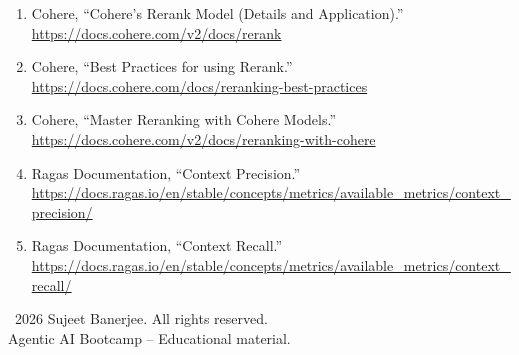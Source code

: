 \documentclass[12pt, a4paper]{article}
\begin{document}
\begin{enumerate}
    \item Cohere, ``Cohere's Rerank Model (Details and Application).''\\
    \url{https://docs.cohere.com/v2/docs/rerank}

    \item Cohere, ``Best Practices for using Rerank.''\\
    \url{https://docs.cohere.com/docs/reranking-best-practices}

    \item Cohere, ``Master Reranking with Cohere Models.''\\
    \url{https://docs.cohere.com/v2/docs/reranking-with-cohere}

    \item Ragas Documentation, ``Context Precision.''\\
    \url{https://docs.ragas.io/en/stable/concepts/metrics/available_metrics/context_precision/}

    \item Ragas Documentation, ``Context Recall.''\\
    \url{https://docs.ragas.io/en/stable/concepts/metrics/available_metrics/context_recall/}
\end{enumerate}

\vfill

\begin{center}
\small
\textcopyright\ 2026 Sujeet Banerjee. All rights reserved.\\
Agentic AI Bootcamp -- Educational material.
\end{center}
\end{document}

